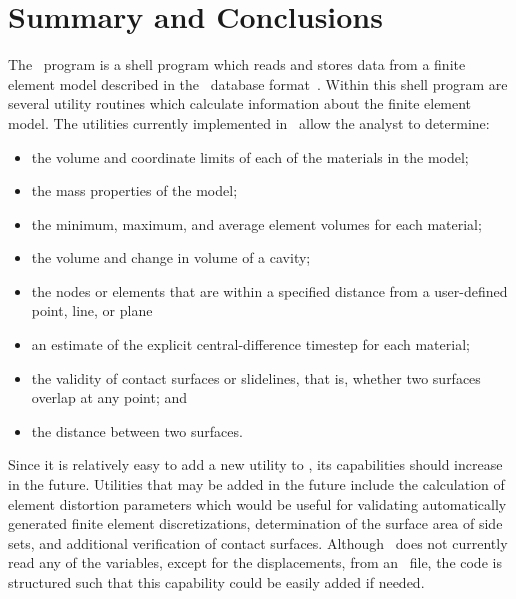 \chapter{Summary and Conclusions}\label{c:conclude}

The \numbers\ program is a shell program which reads and stores data
from a finite element model described in the \exo\ database
format~\cite{EXODUS}. Within this shell program are several utility
routines which calculate information about the finite element model.
The utilities currently implemented in \numbers\ allow the analyst to
determine:
\begin{itemize}
\item the volume and coordinate limits of each of the materials in the model;
\item the mass properties of the model;
\item the minimum, maximum, and average element volumes for each material;
\item the volume and change in volume of a cavity;
\item the nodes or elements that are within a specified distance from a
user-defined point, line, or plane
\item an estimate of the explicit central-difference timestep for each
material;
\item the validity of contact surfaces or slidelines, that is, whether
two surfaces overlap at any point; and
\item the distance between two surfaces.
\end{itemize}

Since it is relatively easy to add a new utility to \numbers, its
capabilities should increase in the future.  Utilities that may be added
in the future include the calculation of element distortion parameters
which would be useful for validating automatically generated finite
element discretizations, determination of the surface area of side sets,
and additional verification of contact surfaces. Although \numbers\ does
not currently read any of the variables, except for the displacements,
from an \exo\ file, the code is structured such that this capability
could be easily added if needed.
